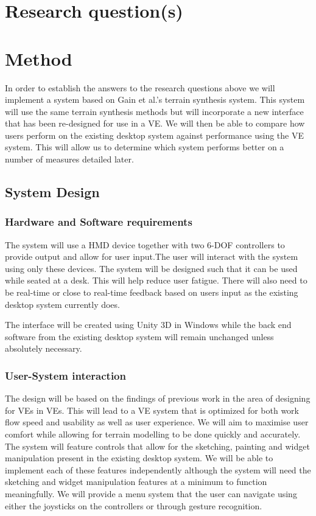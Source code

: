 \documentclass{sig-alternate-05-2015}
\begin{document}
\section{Research question(s)}
\section{Method}
In order to establish the answers to the research questions above we will implement a system based on Gain et al.'s terrain synthesis system\cite{Gain2015}. This system will use the same terrain synthesis methods but will incorporate a new interface that has been re-designed for use in a VE. We will then be able to compare how users perform on the existing desktop system against performance using the VE system. This will allow us to determine which system performs better on a number of measures detailed later.
\subsection{System Design}
\subsubsection{Hardware and Software requirements}
The system will use a HMD device together with two 6-DOF controllers to provide output and allow for user input.The user will interact with the system using only these devices. The system will be designed such that it can be used while seated at a desk. This will help reduce user fatigue\cite{Schultheis2012}. There will also need to be real-time or close to real-time feedback based on users input as the existing desktop system currently does.

The interface will be created using Unity 3D in Windows while the back end software from the existing desktop system will remain unchanged unless absolutely necessary.

\subsubsection{User-System interaction}
The design will be based on the findings of previous work in the area of designing for VEs in VEs. This will lead to a VE system that is optimized for both work flow speed and usability as well as user experience. We will aim to maximise user comfort while allowing for terrain modelling to be done quickly and accurately. The system will feature controls that allow for the sketching, painting and widget manipulation present in the existing desktop system. We will be able to implement each of these features independently although the system will need the sketching and widget manipulation features at a minimum to function meaningfully. We will provide a menu system that the user can navigate using either the joysticks on the controllers or through gesture recognition.
\end{document}
